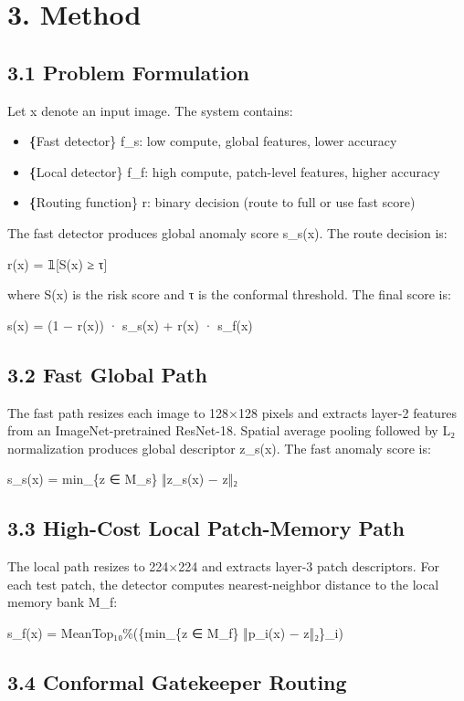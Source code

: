 \documentclass[10pt]{article}
\begin{document}
\section{3. Method}

\subsection{3.1 Problem Formulation}

Let x denote an input image. The system contains:
\begin{itemize}
\item \textbf\{Fast detector\} f\_s: low compute, global features, lower accuracy
\item \textbf\{Local detector\} f\_f: high compute, patch-level features, higher accuracy
\item \textbf\{Routing function\} r: binary decision (route to full or use fast score)
\end{itemize}

The fast detector produces global anomaly score s\_s(x). The route decision is:

r(x) = 𝟙[S(x) ≥ τ]

where S(x) is the risk score and τ is the conformal threshold. The final score is:

s(x) = (1 − r(x)) · s\_s(x) + r(x) · s\_f(x)

\subsection{3.2 Fast Global Path}

The fast path resizes each image to 128×128 pixels and extracts layer-2 features from an ImageNet-pretrained ResNet-18. Spatial average pooling followed by L₂ normalization produces global descriptor z\_s(x). The fast anomaly score is:

s\_s(x) = min\_\{z ∈ M\_s\} ‖z\_s(x) − z‖₂

\subsection{3.3 High-Cost Local Patch-Memory Path}

The local path resizes to 224×224 and extracts layer-3 patch descriptors. For each test patch, the detector computes nearest-neighbor distance to the local memory bank M\_f:

s\_f(x) = MeanTop₁₀\%(\{min\_\{z ∈ M\_f\} ‖p\_i(x) − z‖₂\}\_i)

\subsection{3.4 Conformal Gatekeeper Routing}
\end{document}

